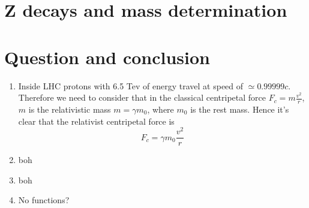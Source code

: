 \documentclass[%
 reprint,
 amsmath,amssymb,
 aps,
]{revtex4-1}
\begin{document}
\section{Z decays and mass determination}


\section{Question and conclusion}
\begin{enumerate}
\item Inside LHC protons with 6.5 Tev of energy travel at speed of $\simeq 0.99999c$. Therefore we need to consider that in the classical centripetal force $F_c = m \frac{v^2}{r}$,
$m$ is the relativistic mass $m = \gamma m_0$, where $m_0$ is the rest mass. Hence it's clear that the relativist centripetal force is
\[F_c = \gamma m_0 \frac{v^2}{r}\]
\item boh
\item boh
\item No functions?

\end{enumerate}
\end{document}
